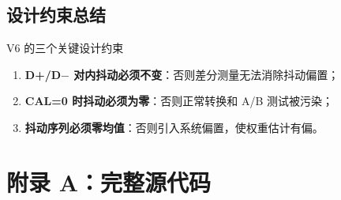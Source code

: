 \documentclass[UTF8,a4paper,11pt]{ctexart}
\begin{document}
\subsection{设计约束总结}

\begin{keybox}{V6 的三个关键设计约束}
\begin{enumerate}[leftmargin=1.5em]
    \item \textbf{D+/D$-$ 对内抖动必须不变}：否则差分测量无法消除抖动偏置；
    \item \textbf{CAL=0 时抖动必须为零}：否则正常转换和 A/B 测试被污染；
    \item \textbf{抖动序列必须零均值}：否则引入系统偏置，使权重估计有偏。
\end{enumerate}
\end{keybox}

\section*{附录 A：完整源代码}
\end{document}
